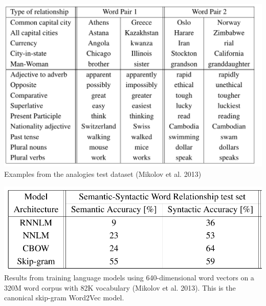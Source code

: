 \documentclass[xcolor=x11names,compress,ignorenonframetext,10pt]{beamer}
\renewcommand{\(}{\begin{columns}}
\renewcommand{\)}{\end{columns}}
\newcommand{\<}[1]{\begin{column}{#1}}
\renewcommand{\>}{\end{column}}
\def\refcolor{DodgerBlue4}
\newcommand{\refer}[1]{({\color{\refcolor}#1})}
\begin{document}
\begin{frame}
\begin{center}
\includegraphics[height=.4\textheight]{figures/word2vec/analogy-pairs}
\\
Examples from the analogies test dataset \refer{Mikolov et al. 2013}
\end{center}

\begin{center}
\includegraphics[height=.3\textheight]{figures/word2vec/word2vec-test-results}
\\
Results from training language models using 640-dimensional word vectors on a 320M word corpus with 82K vocabulary \refer{Mikolov et al. 2013}. This is the canonical skip-gram Word2Vec model.
\end{center}

\end{frame}
\end{document}
